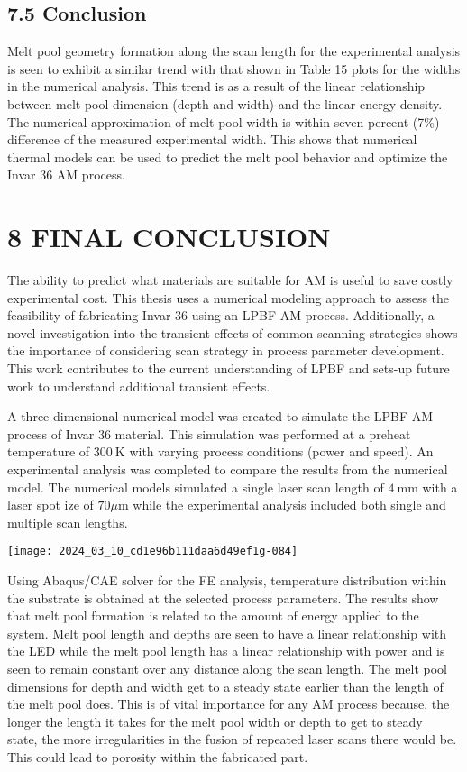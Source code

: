 \documentclass[10pt]{article}
\begin{document}
\subsection*{7.5 Conclusion}
Melt pool geometry formation along the scan length for the experimental analysis is seen to exhibit a similar trend with that shown in Table 15 plots for the widths in the numerical analysis. This trend is as a result of the linear relationship between melt pool dimension (depth and width) and the linear energy density. The numerical approximation of melt pool width is within seven percent (7\%) difference of the measured experimental width. This shows that numerical thermal models can be used to predict the melt pool behavior and optimize the Invar 36 AM process.

\section*{8 FINAL CONCLUSION}
The ability to predict what materials are suitable for AM is useful to save costly experimental cost. This thesis uses a numerical modeling approach to assess the feasibility of fabricating Invar 36 using an LPBF AM process. Additionally, a novel investigation into the transient effects of common scanning strategies shows the importance of considering scan strategy in process parameter development. This work contributes to the current understanding of LPBF and sets-up future work to understand additional transient effects.

A three-dimensional numerical model was created to simulate the LPBF AM process of Invar 36 material. This simulation was performed at a preheat temperature of $300 \mathrm{~K}$ with varying process conditions (power and speed). An experimental analysis was completed to compare the results from the numerical model. The numerical models simulated a single laser scan length of $4 \mathrm{~mm}$ with a laser spot ize of $70 \mu \mathrm{m}$ while the experimental analysis included both single and multiple scan lengths.

\begin{center}
\texttt{[image: 2024\_03\_10\_cd1e96b111daa6d49ef1g-084]}
\end{center}

Using Abaqus/CAE solver for the FE analysis, temperature distribution within the substrate is obtained at the selected process parameters. The results show that melt pool formation is related to the amount of energy applied to the system. Melt pool length and depths are seen to have a linear relationship with the LED while the melt pool length has a linear relationship with power and is seen to remain constant over any distance along the scan length. The melt pool dimensions for depth and width get to a steady state earlier than the length of the melt pool does. This is of vital importance for any AM process because, the longer the length it takes for the melt pool width or depth to get to steady\\
state, the more irregularities in the fusion of repeated laser scans there would be. This could lead to porosity within the fabricated part.
\end{document}
